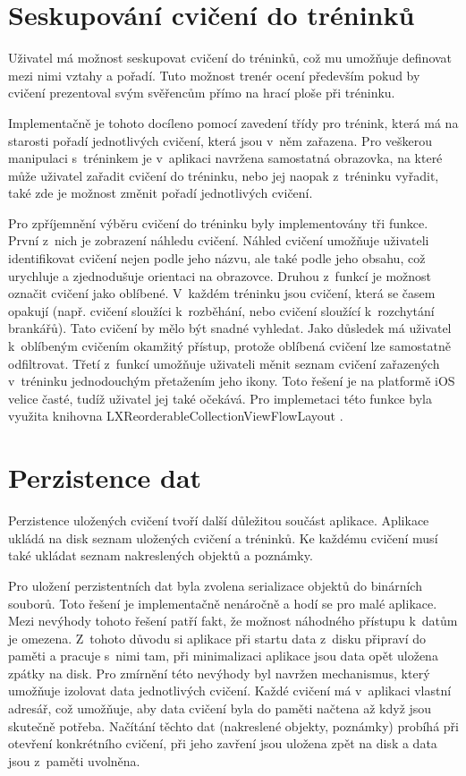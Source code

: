 \documentclass[thesis=B,czech]{FITthesis}[2012/06/26]
\begin{document}
	\section{Seskupování cvičení do tréninků}

	Uživatel má možnost seskupovat cvičení do tréninků, což mu umožňuje definovat mezi nimi vztahy a pořadí. Tuto možnost trenér ocení především pokud by cvičení prezentoval svým svěřencům přímo na hrací ploše při tréninku.

	Implementačně je tohoto docíleno pomocí zavedení třídy pro trénink, která má na starosti pořadí jednotlivých cvičení, která jsou v~něm zařazena. Pro veškerou manipulaci s~tréninkem je v~aplikaci navržena samostatná obrazovka, na které může uživatel zařadit cvičení do tréninku, nebo jej naopak z~tréninku vyřadit, také zde je možnost změnit pořadí jednotlivých cvičení.

	Pro zpříjemnění výběru cvičení do tréninku byly implementovány tři funkce. První z~nich je zobrazení náhledu cvičení. Náhled cvičení umožňuje uživateli identifikovat cvičení nejen podle jeho názvu, ale také podle jeho obsahu, což urychluje a zjednodušuje orientaci na obrazovce. Druhou z~funkcí je možnost označit cvičení jako oblíbené. V~každém tréninku jsou cvičení, která se časem opakují (např. cvičení sloužíci k~rozběhání, nebo cvičení sloužící k~rozchytání brankářů). Tato cvičení by mělo být snadné vyhledat. Jako důsledek má uživatel k~oblíbeným cvičením okamžitý přístup, protože oblíbená cvičení lze samostatně odfiltrovat. Třetí z~funkcí umožňuje uživateli měnit seznam cvičení zařazených v~tréninku jednodouchým přetažením jeho ikony. Toto řešení je na platformě iOS velice časté, tudíž uživatel jej také očekává. Pro implemetaci této funkce byla využita knihovna LXReorderableCollectionViewFlowLayout \cite{reorderableCollectionViewOnline}.

	\section{Perzistence dat}

	Perzistence uložených cvičení tvoří další důležitou součást aplikace. Aplikace ukládá na disk seznam uložených cvičení a tréninků. Ke každému cvičení musí také ukládat seznam nakreslených objektů a poznámky.

	Pro uložení perzistentních dat byla zvolena serializace objektů do binárních souborů. Toto řešení je implementačně nenáročně a hodí se pro malé aplikace. Mezi nevýhody tohoto řešení patří fakt, že možnost náhodného přístupu k~datům je omezena. Z~tohoto důvodu si aplikace při startu data z~disku připraví do paměti a pracuje s~nimi tam, při minimalizaci aplikace jsou data opět uložena zpátky na disk. Pro zmírnění této nevýhody byl navržen mechanismus, který umožňuje izolovat data jednotlivých cvičení. Každé cvičení má v~aplikaci vlastní adresář, což umožňuje, aby data cvičení byla do paměti načtena až když jsou skutečně potřeba. Načítání těchto dat (nakreslené objekty, poznámky) probíhá při otevření konkrétního cvičení, při jeho zavření jsou uložena zpět na disk a data jsou z~paměti uvolněna.
\end{document}
